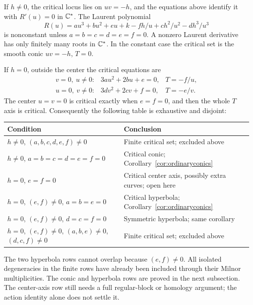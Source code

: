 If $h\ne0$, the critical locus lies on $uv=-h$, and the equations
above identify it with $R'(u)=0$ in $\mathbb C^*$. The Laurent polynomial
\[
 R(u)=a u^3+b u^2+e u+k-fh/u+ch^2/u^2-dh^3/u^3
\]
is nonconstant unless $a=b=c=d=e=f=0$. A nonzero Laurent
derivative has only finitely many roots in $\mathbb C^*$. In the constant
case the critical set is the smooth conic $uv=-h$, $T=0$.

If $h=0$, outside the center the critical equations are
\[
 \begin{array}{lll}
 v=0,\ u\ne0:&3au^2+2bu+e=0,&T=-f/u,\\
 u=0,\ v\ne0:&3dv^2+2cv+f=0,&T=-e/v.
 \end{array}
\]
The center $u=v=0$ is critical exactly when $e=f=0$, and then
the whole $T$ axis is critical. Consequently the following table
is exhaustive and disjoint:
\begin{center}\small
\begin{tabular}{@{}p{}p{}@{}}
\toprule
Condition & Conclusion\\
\midrule
$h\ne0$, $(a,b,c,d,e,f)\ne0$ & Finite critical set; excluded above\\
$h\ne0$, $a=b=c=d=e=f=0$ & Critical conic; Corollary~\ref{cor:ordinaryconics}\\
$h=0$, $e=f=0$ & Critical center axis, possibly extra curves; open here\\
$h=0$, $(e,f)\ne0$, $a=b=e=0$ & Critical hyperbola; Corollary~\ref{cor:ordinaryconics}\\
$h=0$, $(e,f)\ne0$, $d=c=f=0$ & Symmetric hyperbola; same corollary\\
$h=0$, $(e,f)\ne0$, $(a,b,e)\ne0$, $(d,c,f)\ne0$
 & Finite critical set; excluded above\\
\bottomrule
\end{tabular}
\end{center}
The two hyperbola rows cannot overlap because $(e,f)\ne0$.
All isolated degeneracies in the finite rows have already been
included through their Milnor multiplicities. The conic and hyperbola rows are proved in the next subsection.
The center-axis row still needs a full regular-block or homology
argument; the action identity alone does not settle it.
